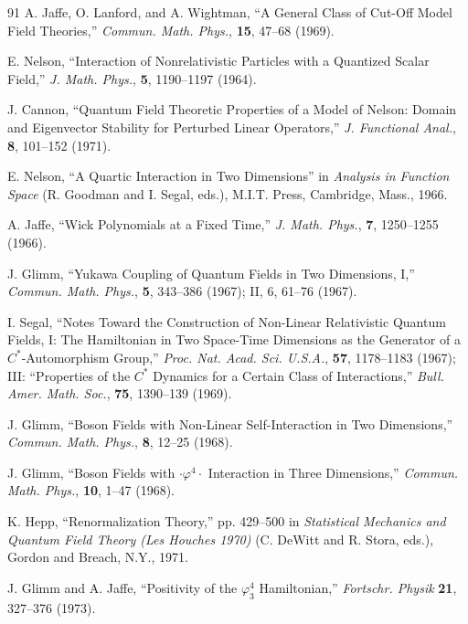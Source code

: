 \begin{thebibliography}{91}
A. Jaffe, O. Lanford, and A. Wightman, ``A General Class of Cut-Off Model
Field Theories,'' \emph{Commun. Math. Phys.}, \textbf{15}, 47--68 (1969).

E. Nelson, ``Interaction of Nonrelativistic Particles with a Quantized Scalar
Field,'' \emph{J. Math. Phys.}, \textbf{5}, 1190--1197 (1964).

J. Cannon, ``Quantum Field Theoretic Properties of a Model of Nelson: Domain
and Eigenvector Stability for Perturbed Linear Operators,'' \emph{J. Functional
Anal.}, \textbf{8}, 101--152 (1971).

E. Nelson, ``A Quartic Interaction in Two Dimensions'' in \emph{Analysis in
Function Space} (R. Goodman and I. Segal, eds.), M.I.T. Press, Cambridge,
Mass., 1966.

A. Jaffe, ``Wick Polynomials at a Fixed Time,'' \emph{J. Math. Phys.},
\textbf{7}, 1250--1255 (1966).

J. Glimm, ``Yukawa Coupling of Quantum Fields in Two Dimensions, I,''
\emph{Commun. Math. Phys.}, \textbf{5}, 343--386 (1967); II, 6, 61--76
(1967).

I. Segal, ``Notes Toward the Construction of Non-Linear Relativistic Quantum
Fields, I: The Hamiltonian in Two Space-Time Dimensions as the Generator of a
$C^*$-Automorphism Group,'' \emph{Proc. Nat. Acad. Sci. U.S.A.}, \textbf{57},
1178--1183 (1967); III: ``Properties of the $C^*$ Dynamics for a Certain Class
of Interactions,'' \emph{Bull. Amer. Math. Soc.}, \textbf{75}, 1390--139
(1969).

J. Glimm, ``Boson Fields with Non-Linear Self-Interaction in Two Dimensions,''
\emph{Commun. Math. Phys.}, \textbf{8}, 12--25 (1968).

J. Glimm, ``Boson Fields with $\cdot\varphi^4\cdot$ Interaction in Three
Dimensions,'' \emph{Commun. Math. Phys.}, \textbf{10}, 1--47 (1968).

K. Hepp, ``Renormalization Theory,'' pp. 429--500 in \emph{Statistical
Mechanics and Quantum Field Theory (Les Houches 1970)} (C. DeWitt and R. Stora,
eds.), Gordon and Breach, N.Y., 1971.

J. Glimm and A. Jaffe, ``Positivity of the $\varphi_3^4$ Hamiltonian,''
\emph{Fortschr. Physik} \textbf{21}, 327--376 (1973).


\end{thebibliography}
